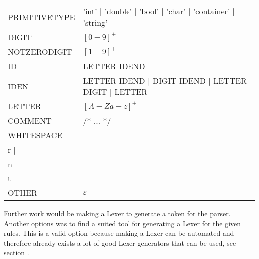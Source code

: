 \begin{tabular}{l l}
PRIMITIVETYPE & 'int' | 'double' | 'bool' | 'char' | 'container' | 'string' \\
DIGIT & $[0-9]^+$ \\
NOTZERODIGIT & $ [1-9]^+$ \\
ID & LETTER IDEND \\
IDEN & LETTER IDEND | DIGIT IDEND | LETTER DIGIT | LETTER \\
LETTER & $[A-Za-z]^+$\\
COMMENT & /* $\dots$ */ \\
WHITESPACE & \\r | \\n | \\t \\
OTHER & $\varepsilon$ \\
\end{tabular}

Further work would be making a Lexer to generate a token for the parser. Another options was to find a suited tool for generating a Lexer for the given rules. This is a valid option because making a Lexer can be automated and therefore already exists a lot of good Lexer generators that can be used, see section .